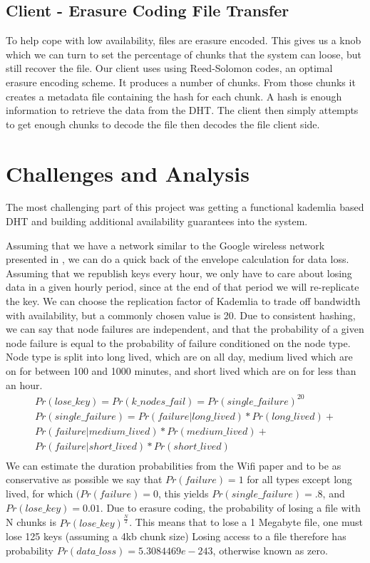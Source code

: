 \documentclass[a4paper,10pt]{article}
\begin{document}
\subsection{Client - Erasure Coding File Transfer}
To help cope with low availability, files are erasure encoded. This gives us a 
knob which we can turn to set the percentage of chunks that the system can 
loose, but still recover the file. Our client uses using Reed-Solomon codes, an 
optimal erasure encoding scheme. It produces a number of chunks. From those 
chunks it creates a metadata file containing the hash for each chunk. A hash is 
enough information to retrieve the data from the DHT. The client then simply 
attempts to get enough chunks to decode the file then decodes the file client 
side.

\section{Challenges and Analysis}
The most challenging part of this project was getting a functional kademlia 
based DHT and building additional availability guarantees into the system.

Assuming that we have a network similar to the Google wireless network 
presented in \cite{wifi}, we can do a quick back of the envelope calculation 
for data loss.  Assuming that we republish keys every hour, we only have to 
care about losing data in a given hourly period, since at the end of that 
period we will re-replicate the key.  We can choose the replication factor of 
Kademlia to trade off bandwidth with availability, but a commonly chosen value 
is 20.  Due to consistent hashing, we can say that node failures are 
independent, and that the probability of a given node failure is equal to the 
probability of failure conditioned on the node type.  Node type is split into 
long lived, which are on all day, medium lived which are on for between 100 and 
1000 minutes, and short lived which are on for less than an hour.  
\begin{multline}
Pr(lose\_key) = Pr(k\_nodes\_fail) = Pr(single\_failure)^{20}
\\
Pr(single\_failure) =
Pr(failure | long\_lived)*Pr(long\_lived) +
\\
Pr(failure | medium\_lived)*Pr(medium\_lived) +
\\
Pr(failure | short\_lived)*Pr(short\_lived)
\\
\end{multline}
We can estimate the duration probabilities from the Wifi paper and to be as 
conservative as possible we say that $Pr(failure)=1$ for all types except long 
lived, for which $(Pr(failure)=0$, this yields $Pr(single\_failure)=.8$, and 
$Pr(lose\_key)=0.01$.  Due to erasure coding, the probability of losing a file 
with N chunks is $Pr(lose\_key)^{\frac{N}{2}}$.  This means that to lose a 1 
Megabyte file, one must lose 125 keys (assuming a 4kb chunk size)  Losing access 
to a file therefore has probability $Pr(data\_loss) = 5.3084469e-243$, 
otherwise known as zero.
\end{document}
